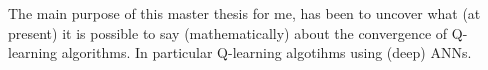 
The main purpose of this master thesis for me,
has been to uncover what (at present) it is possible to say
(mathematically) about the convergence of Q-learning algorithms.
In particular Q-learning algotihms using (deep) ANNs.


